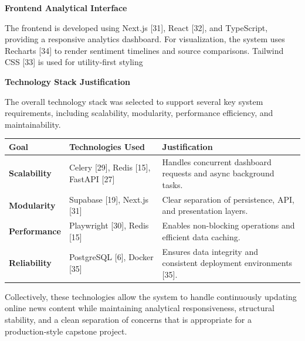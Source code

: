 \textbf{Frontend Analytical Interface}

The frontend is developed using Next.js {[}31{]}, React {[}32{]}, and TypeScript, providing a responsive analytics dashboard. For visualization, the system uses Recharts {[}34{]} to render sentiment timelines and source comparisons. Tailwind CSS {[}33{]} is used for utility-first styling

\textbf{Technology Stack Justification}

The overall technology stack was selected to support several key system requirements, including scalability, modularity, performance efficiency, and maintainability.

{\def\LTcaptype{none} %
\begin{longtable}[]{@{}
  >{\raggedright\arraybackslash}p{}
  >{\raggedright\arraybackslash}p{}
  >{\raggedright\arraybackslash}p{}@{}}
\toprule\noalign{}
\begin{minipage}[b]{\linewidth}\raggedright
\textbf{Goal}
\end{minipage} & \begin{minipage}[b]{\linewidth}\raggedright
\textbf{Technologies Used}
\end{minipage} & \begin{minipage}[b]{\linewidth}\raggedright
\textbf{Justification}
\end{minipage} \\
\midrule\noalign{}
\endhead
\bottomrule\noalign{}
\endlastfoot
\textbf{Scalability} & Celery {[}29{]}, Redis {[}15{]}, FastAPI {[}27{]} & Handles concurrent dashboard requests and async background tasks. \\
\textbf{Modularity} & Supabase {[}19{]}, Next.js {[}31{]} & Clear separation of persistence, API, and presentation layers. \\
\textbf{Performance} & Playwright {[}30{]}, Redis {[}15{]} & Enables non-blocking operations and efficient data caching. \\
\textbf{Reliability} & PostgreSQL {[}6{]}, Docker {[}35{]} & Ensures data integrity and consistent deployment environments {[}35{]}. \\
\end{longtable}
}

Collectively, these technologies allow the system to handle continuously updating online news content while maintaining analytical responsiveness, structural stability, and a clean separation of concerns that is appropriate for a production‑style capstone project.

